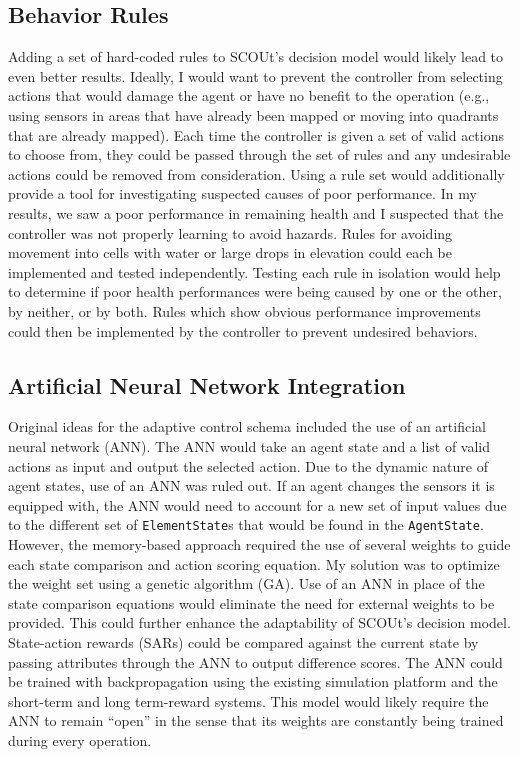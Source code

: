 \subsection{Behavior Rules}
Adding a set of hard-coded rules to SCOUt's decision model would likely lead to even better results.
Ideally, I would want to prevent the controller from selecting actions that would damage the agent or have no benefit to the operation (e.g., using sensors in areas that have already been mapped or moving into quadrants that are already mapped).
Each time the controller is given a set of valid actions to choose from, they could be passed through the set of rules and any undesirable actions could be removed from consideration.
Using a rule set would additionally provide a tool for investigating suspected causes of poor performance.
In my results, we saw a poor performance in remaining health and I suspected that the controller was not properly learning to avoid hazards.
Rules for avoiding movement into cells with water or large drops in elevation could each be implemented and tested independently.
Testing each rule in isolation would help to determine if poor health performances were being caused by one or the other, by neither, or by both.
Rules which show obvious performance improvements could then be implemented by the controller to prevent undesired behaviors.

\subsection{Artificial Neural Network Integration}
Original ideas for the adaptive control schema included the use of an artificial neural network (ANN).
The ANN would take an agent state and a list of valid actions as input and output the selected action.
Due to the dynamic nature of agent states, use of an ANN was ruled out.
If an agent changes the sensors it is equipped with, the ANN would need to account for a new set of input values due to the different set of \texttt{ElementState}s that would be found in the \texttt{AgentState}.
However, the memory-based approach required the use of several weights to guide each state comparison and action scoring equation.
My solution was to optimize the weight set using a genetic algorithm (GA).
Use of an ANN in place of the state comparison equations would eliminate the need for external weights to be provided.
This could further enhance the adaptability of SCOUt's decision model.
State-action rewards (SARs) could be compared against the current state by passing attributes through the ANN to output difference scores.
The ANN could be trained with backpropagation using the existing simulation platform and the short-term and long term-reward systems.
This model would likely require the ANN to remain ``open'' in the sense that its weights are constantly being trained during every operation.

